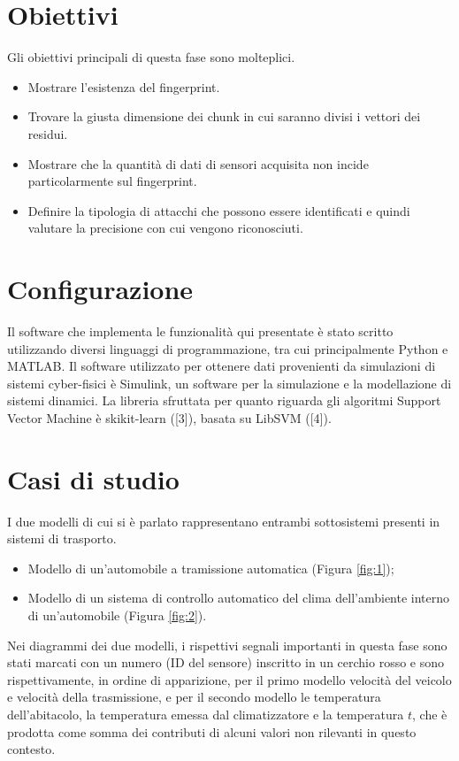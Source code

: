 \documentclass[Lau,binding=0.6cm]{sapthesis}
\begin{document}
\section{Obiettivi}\label{sec:1}
Gli obiettivi principali di questa fase sono molteplici.
\begin{itemize}
    \item Mostrare l'esistenza del fingerprint.
    \item Trovare la giusta dimensione dei chunk in cui saranno divisi i vettori dei residui.
    \item Mostrare che la quantit\`a di dati di sensori acquisita non incide particolarmente sul fingerprint.
    \item Definire la tipologia di attacchi che possono essere identificati e quindi valutare la precisione con cui vengono riconosciuti.
 \end{itemize}

\section{Configurazione}
Il software che implementa le funzionalit\`a qui presentate \`e stato scritto utilizzando diversi linguaggi di programmazione, tra cui principalmente Python e MATLAB.
Il software utilizzato per ottenere dati provenienti da simulazioni di sistemi cyber-fisici \`e Simulink, un software per la simulazione e la modellazione di sistemi dinamici.
La libreria sfruttata per quanto riguarda gli algoritmi Support Vector Machine \`e skikit-learn ([3]), basata su LibSVM ([4]).

\newpage
\section{Casi di studio}
I due modelli di cui si \`e parlato rappresentano entrambi sottosistemi presenti in sistemi di trasporto.
\begin{itemize}
    \item Modello di un'automobile a tramissione automatica (Figura \ref{fig:1});
    \item Modello di un sistema di controllo automatico del clima dell'ambiente interno di un'automobile (Figura \ref{fig:2}).
\end{itemize}
Nei diagrammi dei due modelli, i rispettivi segnali importanti in questa fase sono stati marcati con un numero (ID del sensore) inscritto in un cerchio rosso e sono rispettivamente, 
in ordine di apparizione, per il primo modello velocit\`a del veicolo e velocit\`a della trasmissione, e per il secondo modello le temperatura dell'abitacolo, la temperatura emessa dal climatizzatore e la temperatura $t$, che \`e prodotta come somma dei contributi di alcuni valori non rilevanti in questo contesto.
\end{document}

